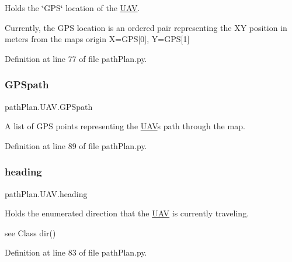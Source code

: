Holds the \char`\"{}\+G\+P\+S\char`\"{} location of the \mbox{\hyperlink{classpath_plan_1_1_u_a_v}{U\+AV}}. 

Currently, the G\+PS location is an ordered pair representing the XY position in meters from the map\textquotesingle{}s origin X=G\+PS\mbox{[}0\mbox{]}, Y=G\+PS\mbox{[}1\mbox{]} 

Definition at line 77 of file path\+Plan.\+py.

\mbox{\label{classpath_plan_1_1_u_a_v_a1d6d4797e8ac522de0da65ba882b8616}} 
\subsubsection{\texorpdfstring{G\+P\+Spath}{GPSpath}}
{\footnotesize\ttfamily path\+Plan.\+U\+A\+V.\+G\+P\+Spath}



A list of G\+PS points representing the \mbox{\hyperlink{classpath_plan_1_1_u_a_v}{U\+AV}}\textquotesingle{}s path through the map. 



Definition at line 89 of file path\+Plan.\+py.

\mbox{\label{classpath_plan_1_1_u_a_v_ac49fa37a2aaf8fe987f1500069c4f903}} 
\subsubsection{\texorpdfstring{heading}{heading}}
{\footnotesize\ttfamily path\+Plan.\+U\+A\+V.\+heading}



Holds the enumerated direction that the \mbox{\hyperlink{classpath_plan_1_1_u_a_v}{U\+AV}} is currently traveling. 

see Class dir() 

Definition at line 83 of file path\+Plan.\+py.

\mbox{\label{classpath_plan_1_1_u_a_v_a8c6578c4b96f4704489038660a4ebe58}} 
